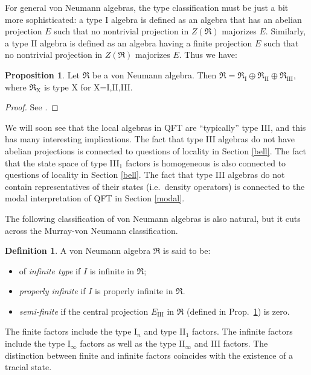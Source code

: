 \documentclass[12pt]{article}
\newcommand{\alg}[1]{\mathfrak{#1}}
\theoremstyle{definition}
\newtheorem{prop}[thm]{Proposition}
\theoremstyle{definition}
\newtheorem{defn}[thm]{Definition}
\theoremstyle{remark}
\begin{document}
For general von Neumann algebras, the type classification must be just
a bit more sophisticated: a type I algebra is defined as an algebra
that has an abelian projection $E$ such that no nontrivial projection
in $Z(\alg{R})$ majorizes $E$.  Similarly, a type II algebra is
defined as an algebra having a finite projection $E$ such that no
nontrivial projection in $Z(\alg{R})$ majorizes $E$.  Thus we have:

\begin{prop} Let $\alg{R}$ be a von Neumann algebra.  Then
  $\alg{R}=\alg{R}_{\mathrm{I}}\oplus \alg{R}_{\mathrm{II}}\oplus
  \alg{R}_{\mathrm{III}}$, where $\alg{R}_{\mathrm{X}}$ is type X for X=I,II,III.
  \label{threeway}
\end{prop}

\begin{proof} See \cite[Thm.\ 6.5.2]{kr}. \end{proof}

We will soon see that the local algebras in QFT are ``typically'' type III, and this
has many interesting implications.  The fact that type III algebras do not have
abelian projections is connected to questions of locality in Section \ref{bell}.  The
fact that the state space of type III$_1$ factors is homogeneous is also connected to
questions of locality in Section \ref{bell}.  The fact that type III algebras do not
contain representatives of their states (i.e.\ density operators) is connected to the
modal interpretation of QFT in Section \ref{modal}.

The following classification of von Neumann algebras is also natural,
but it cuts across the Murray-von Neumann classification.

\begin{defn} A von Neumann algebra $\alg{R}$ is said to be:
\begin{itemize}
\item of \emph{infinite type} if $I$ is infinite in $\alg{R}$;
\item \emph{properly infinite} if $I$ is properly infinite in $\alg{R}$.
\item \emph{semi-finite} if the central projection $E_{\mathrm{III}}$ in $\alg{R}$
  (defined in Prop.\ \ref{threeway}) is zero.
\end{itemize}\end{defn}

The finite factors include the type I$_n$ and type II$_1$ factors.
The infinite factors include the type I$_{\infty}$ factors as well as
the type II$_{\infty}$ and III factors.  The distinction between
finite and infinite factors coincides with the existence of a tracial
state.
\end{document}
